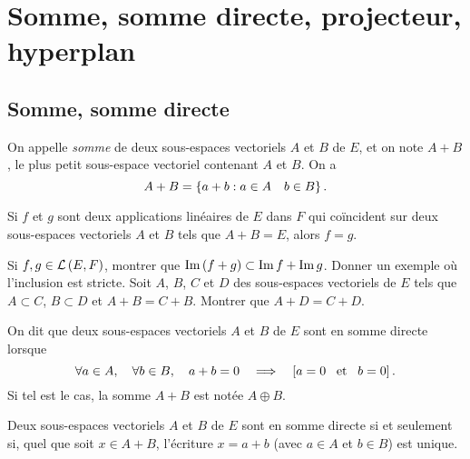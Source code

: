 \documentclass{magnolia}
\begin{document}
\section{Somme, somme directe, projecteur, hyperplan}
\subsection{Somme, somme directe}

\begin{definition}[utile=-3]
On appelle \emph{somme} de deux sous-espaces vectoriels $A$ et $B$ de $E$, et on
note $A+B$, le plus petit sous-espace vectoriel contenant $A$ et $B$. On a
\[A+B=\left\{a+b : a\in A \quad b\in B\right\}.\]
\end{definition}

\begin{remarqueUnique}
\remarque[utile=1] Si $f$ et $g$ sont deux applications linéaires de $E$ dans $F$ qui
  coïncident sur deux sous-espaces vectoriels $A$ et $B$ tels que $A+B=E$, alors
  $f=g$.
\end{remarqueUnique}

\begin{exos}
\exo Si $f,g\in\mathcal{L}\left(E,F\right)$, montrer que $\operatorname{Im}\left(f+g\right)\subset\operatorname{Im} f+\operatorname{Im} g$.
  Donner un exemple où l'inclusion est stricte.
\exo Soit $A$, $B$, $C$ et $D$ des sous-espaces vectoriels de $E$ tels que
  $A\subset C$, $B\subset D$ et $A+B=C+B$. Montrer que $A+D=C+D$.
\end{exos}

\begin{definition}[utile=-3]
On dit que deux sous-espaces vectoriels $A$ et $B$ de $E$ sont en somme
directe lorsque
\[\forall a\in A,\quad \forall b\in B,\quad a+b=0 \quad\Longrightarrow\quad \left[a=0 \quad\!\text{et}\quad\! b=0\right].\]
Si tel est le cas, la somme $A+B$ est notée $A\oplus B$.
\end{definition}

\begin{remarqueUnique}
\remarque Deux sous-espaces vectoriels $A$ et $B$ de $E$ sont en somme directe
  si et seulement si, quel que soit $x\in A+B$, l'écriture $x=a+b$
  (avec $a\in A$ et $b\in B$) est unique.
\end{remarqueUnique}

\end{document}
